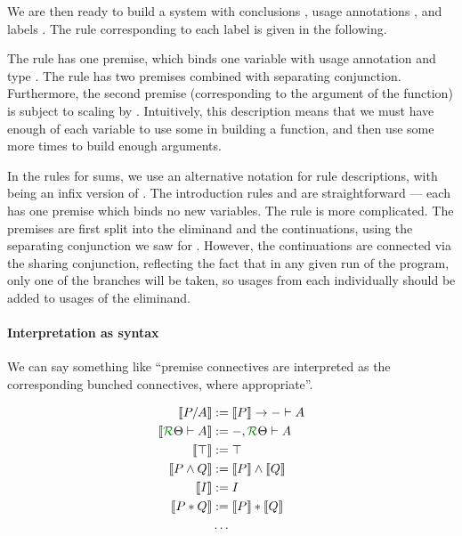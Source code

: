 \documentclass[a4paper]{article}
\begin{document}
\exItypes{} \exIlabels{}

We are then ready to build a system  with conclusions
, usage annotations , and labels
.
The rule corresponding to each label is given in the following.

The  rule has one premise, which binds one
variable with usage annotation  and type .
The  rule has two premises combined with
separating conjunction.
Furthermore, the second premise (corresponding to the argument of the function)
is subject to scaling by .
Intuitively, this description means that we must have enough of each variable to
use some in building a function, and then use some more  times to
build enough arguments.

\exIfunrules{}

In the rules for sums, we use an alternative notation for rule descriptions,
with \AgdaFunction{{---}{---}} being an infix version of
.
The introduction rules  and
 are straightforward --- each has one
premise which binds no new variables.
The  rule is more complicated.
The premises are first split into the eliminand and the continuations, using the
separating conjunction we saw for .
However, the continuations are connected via the sharing conjunction, reflecting
the fact that in any given run of the program, only one of the branches will be
taken, so usages from each individually should be added to usages of the
eliminand.

\exIsumrules{}

\paragraph{Interpretation as syntax}
We can say something like ``premise connectives are interpreted as the
corresponding bunched connectives, where appropriate''.

\begin{align*}
  \sem{P/A} &:= \sem P \to {- \vdash A} \\
  \sem{\ctx \Theta R \vdash A} &:= {-, \ctx \Theta R \vdash A} \\
  \sem{\top} &:= \top \\
  \sem{P \wedge Q} &:= \sem P \wedge \sem Q \\
  \sem{I} &:= I \\
  \sem{P * Q} &:= \sem P * \sem Q \\
  &\ldots
\end{align*}
\end{document}
